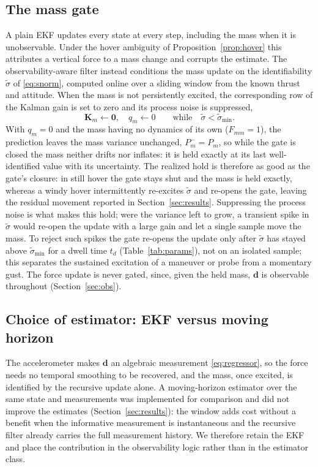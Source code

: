 \documentclass[lettersize,journal]{IEEEtran}
\newcommand{\vect}[1]{\bm{#1}}
\newcommand{\mat}[1]{\mathbf{#1}}
\begin{document}
\subsection{The mass gate}\label{sec:gate}
A plain EKF updates every state at every step, including the mass when it is
unobservable. Under the hover ambiguity of Proposition~\ref{prop:hover} this
attributes a vertical force to a mass change and corrupts the estimate. The
observability-aware filter instead conditions the mass update on the
identifiability $\tilde\sigma$ of \eqref{eq:snorm}, computed online over a sliding
window from the known thrust and attitude. When the mass is not persistently
excited, the corresponding row of the Kalman gain is set to zero and its process
noise is suppressed,
\begin{equation}
\mat{K}_m\leftarrow\vect{0},\quad q_m\leftarrow 0
\qquad\text{while}\quad \tilde\sigma<\tilde\sigma_{\min}.
\label{eq:gate}
\end{equation}
With $q_m=0$ and the mass having no dynamics of its own ($F_{mm}=1$), the
prediction leaves the mass variance unchanged, $P_m^-=P_m$, so while the gate is
closed the mass neither drifts nor inflates: it is held exactly at its last
well-identified value with its uncertainty. The realized hold is therefore as good
as the gate's closure: in still hover the gate stays shut and the mass is held
exactly, whereas a windy hover intermittently re-excites $\tilde\sigma$ and
re-opens the gate, leaving the residual movement reported in
Section~\ref{sec:results}. Suppressing the process noise is what
makes this hold; were the variance left to grow, a transient spike in
$\tilde\sigma$ would re-open the update with a large gain and let a single sample
move the mass. To reject such spikes the gate re-opens the update only after
$\tilde\sigma$ has stayed above $\tilde\sigma_{\min}$ for a dwell time $t_d$
(Table~\ref{tab:params}), not on an isolated sample; this separates the sustained
excitation of a maneuver or probe from a momentary gust. The force update is
never gated, since, given the held mass, $\vect{d}$ is observable throughout
(Section~\ref{sec:obs}).

\subsection{Choice of estimator: EKF versus moving horizon}\label{sec:nomhe}
The accelerometer makes $\vect{d}$ an algebraic measurement \eqref{eq:regressor},
so the force needs no temporal smoothing to be recovered, and the mass, once
excited, is identified by the recursive update alone. A moving-horizon estimator
over the same state and measurements was implemented for comparison and did not
improve the estimates (Section~\ref{sec:results}): the window adds cost without a
benefit when the informative measurement is instantaneous and the recursive
filter already carries the full measurement history. We therefore retain the EKF
and place the contribution in the observability logic rather than in the
estimator class.
\end{document}
